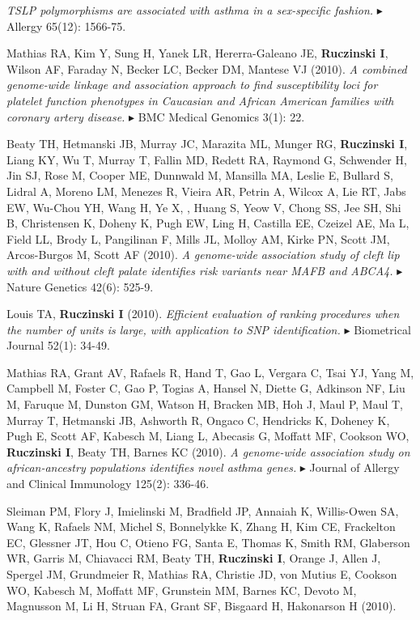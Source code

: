 \documentclass[10pt]{article}
\newcommand{\mine}{
  \addtocounter{enumi}{1}
\item[\fcolorbox{white}{grey}{\color{white} \tiny \arabic{enumi}}]
}
\newcommand{\dg}[1]{{\color{black} $\blacktriangleright$ {#1}}}
\begin{document}
{\it TSLP polymorphisms are associated with asthma in a sex-specific fashion.}
\dg{Allergy} 65(12): 1566-75.
\item
Mathias RA, Kim Y, Sung H, Yanek LR, Hererra-Galeano JE, {\bf Ruczinski I}, Wilson AF, Faraday N, Becker LC, Becker DM, Mantese VJ (2010).
{\it A combined genome-wide linkage and association approach to find susceptibility loci for platelet function phenotypes in Caucasian and African American families with coronary artery disease.}
\dg{BMC Medical Genomics} 3(1): 22.
\item
Beaty TH, Hetmanski JB, Murray JC, Marazita ML, Munger RG, {\bf Ruczinski I}, Liang KY, Wu T, Murray T, Fallin MD, Redett RA, Raymond G, Schwender H, Jin SJ, Rose M, Cooper ME, Dunnwald M, Mansilla MA, Leslie E, Bullard S, Lidral A, Moreno LM, Menezes R, Vieira AR, Petrin A, Wilcox A, Lie RT, Jabs EW, Wu-Chou YH, Wang H, Ye X, , Huang S, Yeow V, Chong SS, Jee SH, Shi B, Christensen K, Doheny K, Pugh EW, Ling H, Castilla EE, Czeizel AE, Ma L, Field LL, Brody L,  Pangilinan F,  Mills JL, Molloy AM, Kirke PN, Scott JM, Arcos-Burgos M, Scott AF (2010).
{\it A genome-wide association study of cleft lip with and without cleft palate identifies risk variants near MAFB and ABCA4.}
\dg{Nature Genetics} 42(6): 525-9. 
\mine                       
Louis TA, {\bf Ruczinski I} (2010).
{\it Efficient evaluation of ranking procedures when the number of units is large, with application to SNP identification.}
\dg{Biometrical Journal} 52(1): 34-49. 
\item
Mathias RA, Grant AV, Rafaels R, Hand T, Gao L, Vergara C, Tsai YJ, Yang M, Campbell M, Foster C, Gao P, Togias A, Hansel N, Diette G, Adkinson NF, Liu M, Faruque M, Dunston GM, Watson H, Bracken MB, Hoh J, Maul P, Maul T, Murray T, Hetmanski JB, Ashworth R, Ongaco C, Hendricks K, Doheney K, Pugh E, Scott AF, Kabesch M, Liang L, Abecasis G, Moffatt MF, Cookson WO, {\bf Ruczinski I}, Beaty TH, Barnes KC (2010).
{\it A genome-wide association study on african-ancestry populations identifies novel asthma genes.}
\dg{Journal of Allergy and Clinical Immunology} 125(2): 336-46.
\item
Sleiman PM, Flory J, Imielinski M, Bradfield JP, Annaiah K, Willis-Owen SA, Wang K, Rafaels NM, Michel S, Bonnelykke K, Zhang H, Kim CE, Frackelton EC, Glessner JT, Hou C, Otieno FG, Santa E, Thomas K, Smith RM, Glaberson WR, Garris M, Chiavacci RM, Beaty TH, {\bf Ruczinski I},  Orange J, Allen J, Spergel JM, Grundmeier R, Mathias RA, Christie JD, von Mutius E, Cookson WO, Kabesch M, Moffatt MF, Grunstein MM, Barnes KC, Devoto M, Magnusson M, Li H, Struan FA, Grant SF, Bisgaard H, Hakonarson H (2010).
\end{document}
